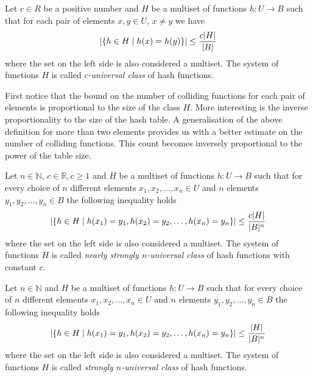\begin{definition}
\label{c_universal_system}
Let $c \in R$ be a positive number and $H$ be a multiset of functions $h: U \rightarrow B$ such that for each pair of elements $x, y \in U$, $x \neq y$ we have 
\[ 
	\left| \lbrace h \in H \mid h(x) = h(y) \rbrace \right| \leq \frac {c |H|}{|B|}
\] 
where the set on the left side is also considered a multiset. The system of functions $H$ is called \emph{$c$-universal class} of hash functions.
\end{definition}

First notice that the bound on the number of colliding functions for each pair of elements is proportional to the size of the class $H$. More interesting is the inverse proportionality to the size of the hash table. A generalisation of the above definition for more than two elements provides us with a better estimate on the number of colliding functions. This count becomes inversely proportional to the power of the table size.

\begin{definition}
\label{nearly_strong_universal_n_system}
Let $n \in \mathbb{N}$, $c \in \mathbb{R}, c \geq 1$ and $H$ be a multiset of functions $h: U \rightarrow B$ such that for every choice of $n$ different elements $x_1, x_2, \dots, x_n \in U$ and $n$ elements $y_1, y_2, \dots, y_n \in B$ the following inequality holds
\[ 
	\left|\lbrace h \in H \mid h(x_1) = y_1, h(x_2) = y_2, \dots, h(x_n) = y_n \rbrace \right| \leq \frac{c|H|}{|B|^n}
\] 
where the set on the left side is also considered a multiset. The system of functions $H$ is called \emph{nearly strongly $n$-universal class} of hash functions with constant $c$.
\end{definition}

\begin{definition}
\label{strong_universal_n_system}
Let $n \in \mathbb{N}$ and $H$ be a multiset of functions $h: U \rightarrow B$ such that for every choice of $n$ different elements $x_1, x_2, \dots, x_n \in U$ and $n$ elements $y_1, y_2, \dots, y_n \in B$ the following inequality holds
\[ 
	\left|\lbrace h \in H \mid h(x_1) = y_1, h(x_2) = y_2, \dots, h(x_n) = y_n \rbrace \right| \leq \frac{|H|}{|B|^n}
\] 
where the set on the left side is also considered a multiset. The system of functions $H$ is called \emph{strongly $n$-universal class} of hash functions.
\end{definition}

